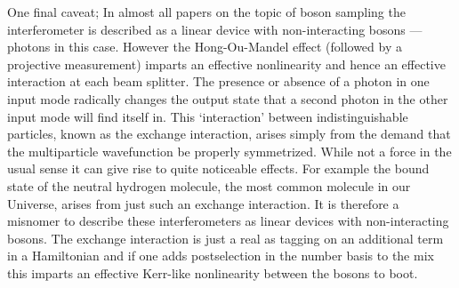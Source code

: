 \documentclass[aps,pra,twocolumn,amsmath,amssymb,nofootinbib,superscriptaddress]{revtex4}
\begin{document}
	One final caveat; In almost all papers on the topic of boson sampling the interferometer is described as a linear device with non-interacting bosons — photons in this case. However the Hong-Ou-Mandel effect (followed by a projective measurement) imparts an effective nonlinearity and hence an effective interaction at each beam splitter. The presence or absence of a photon in one input mode radically changes the output state that a second photon in the other input mode will find itself in. This ‘interaction’ between indistinguishable particles, known as the exchange interaction, arises simply from the demand that the multiparticle wavefunction be properly symmetrized. While not a force in the usual sense it can give rise to quite noticeable effects. For example the bound state of the neutral hydrogen molecule, the most common molecule in our Universe, arises from just such an exchange interaction. It is therefore a misnomer to describe these interferometers as linear devices with non-interacting bosons. The exchange interaction is just a real as tagging on an additional term in a Hamiltonian and if one adds postselection in the number basis to the mix this imparts an effective Kerr-like nonlinearity between the bosons to boot.  
\end{document}
